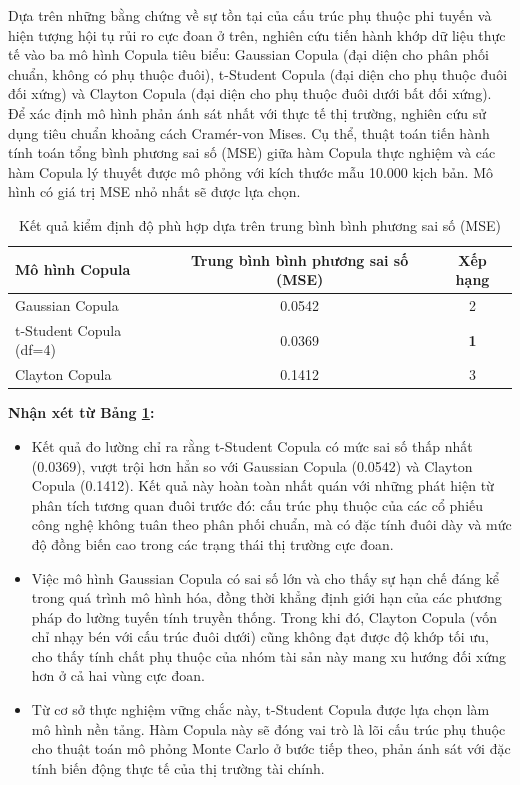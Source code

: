 Dựa trên những bằng chứng về sự tồn tại của cấu trúc phụ thuộc phi tuyến và hiện tượng hội tụ rủi ro cực đoan ở trên, nghiên cứu tiến hành khớp dữ liệu thực tế vào ba mô hình Copula tiêu biểu: Gaussian Copula (đại diện cho phân phối chuẩn, không có phụ thuộc đuôi), t-Student Copula (đại diện cho phụ thuộc đuôi đối xứng) và Clayton Copula (đại diện cho phụ thuộc đuôi dưới bất đối xứng).\\
Để xác định mô hình phản ánh sát nhất với thực tế thị trường, nghiên cứu sử dụng tiêu chuẩn khoảng cách Cramér-von Mises. Cụ thể, thuật toán tiến hành tính toán tổng bình phương sai số (MSE) giữa hàm Copula thực nghiệm và các hàm Copula lý thuyết được mô phỏng với kích thước mẫu 10.000 kịch bản. Mô hình có giá trị MSE nhỏ nhất sẽ được lựa chọn.

\begin{table}[H]
    \centering
    \caption{Kết quả kiểm định độ phù hợp dựa trên trung bình bình phương sai số (MSE)}
    \vspace{0.2cm}
    \begin{tabular}{|l|c|c|}
        \hline
        \textbf{Mô hình Copula} & \textbf{Trung bình bình phương sai số (MSE)} & \textbf{Xếp hạng} \\
        \hline
        Gaussian Copula & 0.0542 & 2 \\ %
        t-Student Copula (df=4) & 0.0369 & \textbf{1} \\ %
        Clayton Copula & 0.1412 & 3 \\ %
        \hline
    \end{tabular}
    \label{tab:gof_copula}
\end{table}
\begin{flushleft}
\textbf{Nhận xét từ Bảng \ref{tab:gof_copula}:}
\begin{itemize}
    \item Kết quả đo lường chỉ ra rằng t-Student Copula có mức sai số thấp nhất (0.0369), vượt trội hơn hẳn so với Gaussian Copula (0.0542) và Clayton Copula (0.1412). Kết quả này hoàn toàn nhất quán với những phát hiện từ phân tích tương quan đuôi trước đó: cấu trúc phụ thuộc của các cổ phiếu công nghệ không tuân theo phân phối chuẩn, mà có đặc tính đuôi dày và mức độ đồng biến cao trong các trạng thái thị trường cực đoan.
    \item Việc mô hình Gaussian Copula có sai số lớn và cho thấy sự hạn chế đáng kể trong quá trình mô hình hóa, đồng thời khẳng định giới hạn của các phương pháp đo lường tuyến tính truyền thống. Trong khi đó, Clayton Copula (vốn chỉ nhạy bén với cấu trúc đuôi dưới) cũng không đạt được độ khớp tối ưu, cho thấy tính chất phụ thuộc của nhóm tài sản này mang xu hướng đối xứng hơn ở cả hai vùng cực đoan.
    \item Từ cơ sở thực nghiệm vững chắc này, t-Student Copula được lựa chọn làm mô hình nền tảng. Hàm Copula này sẽ đóng vai trò là lõi cấu trúc phụ thuộc cho thuật toán mô phỏng Monte Carlo ở bước tiếp theo, phản ánh sát với đặc tính biến động thực tế của thị trường tài chính.
\end{itemize}
\end{flushleft}
